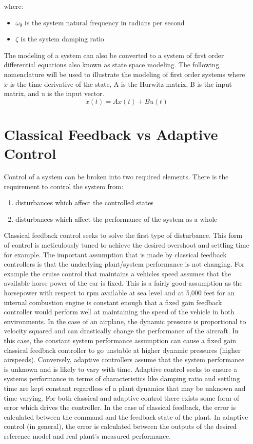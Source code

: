 where:
\begin{itemize}
	\item[] $\omega_0$ is the system natural frequency in radians per second
	\item[] $\zeta$ is the system damping ratio
\end{itemize}

The modeling of a system can also be converted to a system of first order differential equations also known as state space modeling.  The following nomenclature will be used to illustrate the modeling of first order systems where $\dot{x}$ is the time derivative of the state, A is the Hurwitz matrix, B is the input matrix, and u is the input vector.
\begin{equation}\label{eq:state_space_model}
\dot{x}(t)=Ax(t)+Bu(t)
\end{equation}



\section{Classical Feedback vs Adaptive Control}
Control of a system can be broken into two required elements.  There is the requirement to control the system from:
\begin{enumerate}
	\item disturbances which affect the controlled states 
	\item disturbances which affect the performance of the system as a whole
\end{enumerate}
Classical feedback control seeks to solve the first type of disturbance.  This form of control is meticulously tuned to achieve the desired overshoot and settling time for example.  The important assumption that is made by classical feedback controllers is that the underlying plant/system performance is not changing.  For example the cruise control that maintains a vehicles speed assumes that the available horse power of the car is fixed.  This is a fairly good assumption as the horsepower with respect to rpm available at sea level and at 5,000 feet for an internal combustion engine is constant enough that a fixed gain feedback controller would perform well at maintaining the speed of the vehicle in both environments.  In the case of an airplane, the dynamic pressure is proportional to velocity squared and can drastically change the performance of the aircraft.  In this case, the constant system performance assumption can cause a fixed gain classical feedback controller to go unstable at higher dynamic pressures (higher airspeeds).   Conversely, adaptive controllers assume that the system performance is unknown and is likely to vary with time.  Adaptive control seeks to ensure a systems performance in terms of characteristics like damping ratio and settling time are kept constant regardless of a plant dynamics that may be unknown and time varying.  For both classical and adaptive control there exists some form of error which drives the controller.  In the case of classical feedback, the error is calculated between the command and the feedback state of the plant. In adaptive control (in general), the error is calculated between the outputs of the desired reference model and real plant's measured performance.

